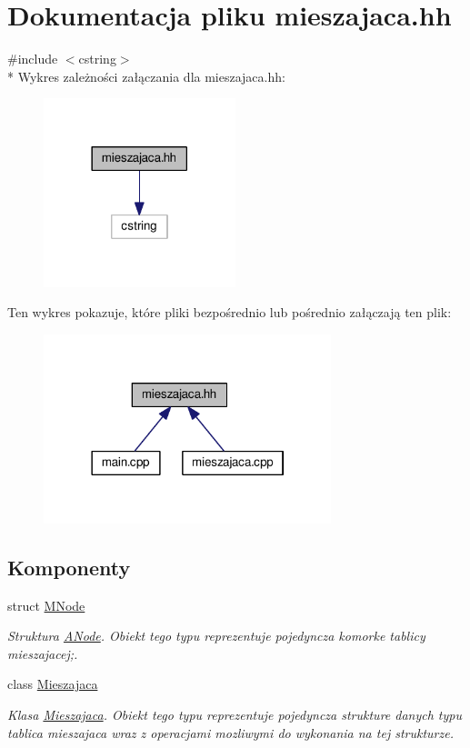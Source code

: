\hypertarget{mieszajaca_8hh}{\section{Dokumentacja pliku mieszajaca.\-hh}
\label{mieszajaca_8hh}
}
{\ttfamily \#include $<$cstring$>$}\\*
Wykres zależności załączania dla mieszajaca.\-hh\-:\nopagebreak
\begin{figure}[H]
\begin{center}
\leavevmode
\includegraphics[width=158pt]{mieszajaca_8hh__incl}
\end{center}
\end{figure}
Ten wykres pokazuje, które pliki bezpośrednio lub pośrednio załączają ten plik\-:\nopagebreak
\begin{figure}[H]
\begin{center}
\leavevmode
\includegraphics[width=237pt]{mieszajaca_8hh__dep__incl}
\end{center}
\end{figure}
\subsection*{Komponenty}
\begin{DoxyCompactItemize}
\item 
struct \hyperlink{struct_m_node}{M\-Node}
\begin{DoxyCompactList}\small\item\em Struktura \hyperlink{struct_a_node}{A\-Node}. Obiekt tego typu reprezentuje pojedyncza komorke tablicy mieszajacej;. \end{DoxyCompactList}\item 
class \hyperlink{class_mieszajaca}{Mieszajaca}
\begin{DoxyCompactList}\small\item\em Klasa \hyperlink{class_mieszajaca}{Mieszajaca}. Obiekt tego typu reprezentuje pojedyncza strukture danych typu tablica mieszajaca wraz z operacjami mozliwymi do wykonania na tej strukturze. \end{DoxyCompactList}\end{DoxyCompactItemize}
